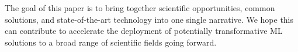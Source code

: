 The goal of this paper is to bring together scientific opportunities, common solutions,
and state-of-the-art technology into one single narrative. We hope this can contribute to accelerate the deployment of potentially transformative ML solutions to a broad range of scientific fields going forward. 






